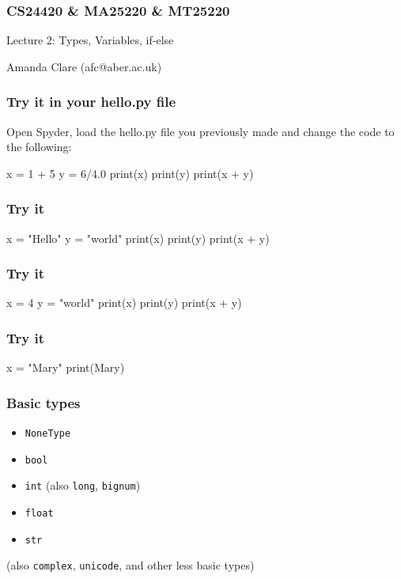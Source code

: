 \documentclass{beamer}
\begin{document}

\begin{frame}
\frametitle{CS24420 \& MA25220 \& MT25220}

\begin{center}
\begin{huge}
Lecture 2: Types, Variables, if-else 
\end{huge}
\bigskip

Amanda Clare (afc@aber.ac.uk)

\end{center}
\end{frame}


\begin{frame}[fragile]
\frametitle{Try it in your hello.py file}
Open Spyder, load the hello.py file you previously made and change the
code to the following:
\begin{code}
x = 1 + 5
y = 6/4.0
print(x)
print(y)
print(x + y)
\end{code}
\end{frame}

\begin{frame}[fragile]
\frametitle{Try it}
\begin{code}
x = "Hello"
y = "world"
print(x)
print(y)
print(x + y)
\end{code}
\end{frame}


\begin{frame}[fragile]
\frametitle{Try it}
\begin{code}
x = 4
y = "world"
print(x)
print(y)
print(x + y)
\end{code}
\end{frame}

\begin{frame}[fragile]
\frametitle{Try it}
\begin{code}
x = "Mary"
print(Mary)
\end{code}
\end{frame}



\begin{frame}
\frametitle{Basic types}
\begin{itemize}
\item {\tt NoneType}
\item {\tt bool}
\item {\tt int} (also {\tt long}, {\tt bignum})
\item {\tt float}
\item {\tt str} 
\end{itemize}
(also {\tt complex}, {\tt unicode}, and other less basic types)
\end{frame}
\end{document}

